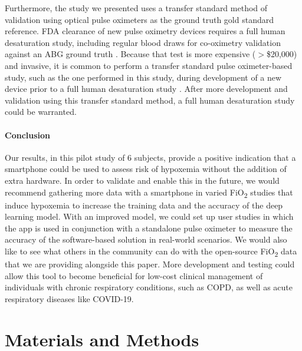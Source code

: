 \documentclass[12pt]{article}
\begin{document}
Furthermore, the study we presented uses a transfer standard method of validation using optical pulse oximeters as the ground truth gold standard reference. FDA clearance of new pulse oximetry devices requires 
a full human desaturation study, including regular blood draws for co-oximetry validation against an ABG ground truth \cite{us2013pulse}.
Because that test is more expensive ($>$\$20,000) and invasive, it is common to perform a transfer standard pulse oximeter-based study, such as the one performed in this study, during development of a new device prior to a full human desaturation study \cite{clinimark2010pulse}. After more development and validation using this transfer standard method, a full human desaturation study could be warranted.

\paragraph*{Conclusion}
Our results, in this pilot study of 6 subjects, provide a positive indication that a smartphone could be used to assess risk of hypoxemia without the addition of extra hardware. In order to validate and enable this in the future, we would recommend gathering more data with a smartphone in varied FiO\textsubscript{2} studies that induce hypoxemia to increase the training data and the accuracy of the deep learning model. With an improved model, we could set up user studies in which the app is used in conjunction with a standalone pulse oximeter to measure the accuracy of the software-based solution in real-world scenarios.
We would also like to see what others in the community can do with the open-source FiO\textsubscript{2} data that we are providing alongside this paper. More development and testing could allow this tool to become beneficial for low-cost clinical management of individuals with chronic respiratory conditions, such as COPD, as well as acute respiratory diseases like COVID-19.

\section*{Materials and Methods}
\end{document}
